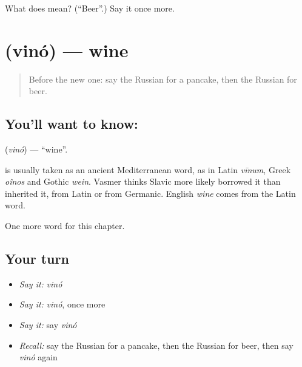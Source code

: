 \begin{tcolorbox}[breakable,colback=teal!4,colframe=teal!35!black,title={Before you move on}]
What does  mean? (\textquotedblleft{}Beer\textquotedblright{}.) Say it once more.
\end{tcolorbox}
\section[\texorpdfstring{\ru{вино} (vinó)}{вино (vinó)}]{ (vinó) — wine}

\label{lesson:RU-C164-vino}



\begin{quote}
Before the new one: say the Russian for a pancake, then the Russian for beer.
\end{quote}

\subsection*{You'll want to know: }
\textbf{} (\emph{vinó}) — \textquotedblleft{}wine\textquotedblright{}.

\begin{cousinweb}
\textbf{} is usually taken as an ancient Mediterranean word, as in Latin \emph{vīnum}, Greek \emph{oînos} and Gothic \emph{wein}. Vasmer thinks Slavic more likely borrowed it than inherited it, from Latin or from Germanic. English \emph{wine} comes from the Latin word.
\end{cousinweb}

\begin{grammarlens}[title={What you've built}]
One more word for this chapter.
\end{grammarlens}

\subsection*{Your turn}
\begin{itemize}
\raggedright
  \item \emph{Say it:} \emph{vinó}
  \item \emph{Say it:} \emph{vinó}, once more
  \item \emph{Say it:} say \emph{vinó}
  \item \emph{Recall:} say the Russian for a pancake, then the Russian for beer, then say \emph{vinó} again
\end{itemize}

